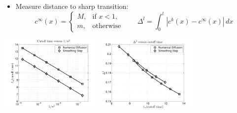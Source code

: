 \documentclass[12pt,t]{beamer}
\begin{document}
\begin{frame}
  \begin{itemize}
  \item Measure distance to sharp transition:
    \begin{equation*}
      c^{\infty}(x) = \begin{cases}
        M, &\text{if } x < 1, \\
        m, &\text{otherwise}
      \end{cases}
      \qquad
      \Delta^l = \int_0^l | c^k(x)-c^{\infty}(x)|\,dx
    \end{equation*}
  \end{itemize}
  \begin{center}
    \includegraphics[width=5cm]{cutofftimevsD}
    \includegraphics[width=5cm]{areavscutofftime}
  \end{center}
\end{frame}
\end{document}
